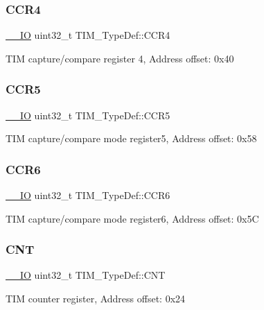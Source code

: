 \subsubsection{\texorpdfstring{CCR4}{CCR4}}
{\footnotesize\ttfamily \mbox{\hyperlink{core__sc300_8h_aec43007d9998a0a0e01faede4133d6be}{\+\_\+\+\_\+\+IO}} uint32\+\_\+t T\+I\+M\+\_\+\+Type\+Def\+::\+C\+C\+R4}

T\+IM capture/compare register 4, Address offset\+: 0x40 \mbox{\label{struct_t_i_m___type_def_af30dc563e6c1b7b7e01e393feb484080}} 
\subsubsection{\texorpdfstring{CCR5}{CCR5}}
{\footnotesize\ttfamily \mbox{\hyperlink{core__sc300_8h_aec43007d9998a0a0e01faede4133d6be}{\+\_\+\+\_\+\+IO}} uint32\+\_\+t T\+I\+M\+\_\+\+Type\+Def\+::\+C\+C\+R5}

T\+IM capture/compare mode register5, Address offset\+: 0x58 \mbox{\label{struct_t_i_m___type_def_a374f851b5f1097a3ebd3f494ded6512a}} 
\subsubsection{\texorpdfstring{CCR6}{CCR6}}
{\footnotesize\ttfamily \mbox{\hyperlink{core__sc300_8h_aec43007d9998a0a0e01faede4133d6be}{\+\_\+\+\_\+\+IO}} uint32\+\_\+t T\+I\+M\+\_\+\+Type\+Def\+::\+C\+C\+R6}

T\+IM capture/compare mode register6, Address offset\+: 0x5C \mbox{\label{struct_t_i_m___type_def_a6fdd2a7fb88d28670b472aaac0d9d262}} 
\subsubsection{\texorpdfstring{CNT}{CNT}}
{\footnotesize\ttfamily \mbox{\hyperlink{core__sc300_8h_aec43007d9998a0a0e01faede4133d6be}{\+\_\+\+\_\+\+IO}} uint32\+\_\+t T\+I\+M\+\_\+\+Type\+Def\+::\+C\+NT}

T\+IM counter register, Address offset\+: 0x24 \mbox{\label{struct_t_i_m___type_def_a9dafc8b03e8497203a8bb395db865328}} 

